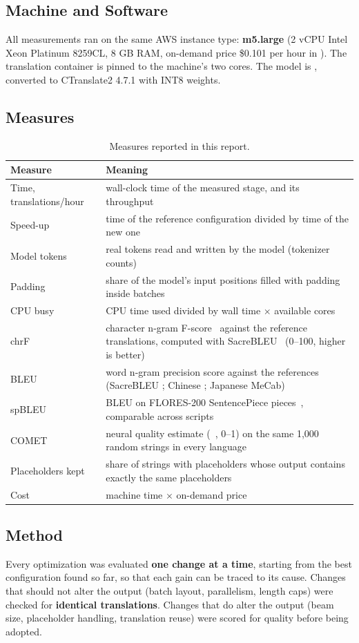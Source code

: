 \subsection{Machine and Software}
All measurements ran on the same AWS instance type: \textbf{m5.large} (2 vCPU Intel Xeon Platinum 8259CL, 8 GB RAM,
on-demand price \$0.101 per hour in ). The translation container is pinned to the machine's two cores.
The model is , converted to CTranslate2 4.7.1 with INT8 weights.

\subsection{Measures}
\begin{table}[H]
\centering
\caption[Measures]{Measures reported in this report.}
\label{tab:measures}
\begin{tabularx}{\linewidth}{@{}l L@{}}
\toprule
\textbf{Measure} & \textbf{Meaning} \\
\midrule
Time, translations/hour & wall-clock time of the measured stage, and its throughput \\
Speed-up & time of the reference configuration divided by time of the new one \\
Model tokens & real tokens read and written by the model (tokenizer counts) \\
Padding & share of the model's input positions filled with padding inside batches \\
CPU busy & CPU time used divided by wall time $\times$ available cores \\
chrF & character n-gram F-score~\cite{chrf} against the reference translations, computed with SacreBLEU~\cite{sacrebleu} (0--100, higher is better) \\
BLEU & word n-gram precision score against the references (SacreBLEU ; Chinese ; Japanese MeCab) \\
spBLEU & BLEU on FLORES-200 SentencePiece pieces~\cite{flores}, comparable across scripts \\
COMET & neural quality estimate (~\cite{comet}, 0--1) on the same 1,000 random strings in every language \\
Placeholders kept & share of strings with placeholders whose output contains exactly the same placeholders \\
Cost & machine time $\times$ on-demand price \\
\bottomrule
\end{tabularx}
\end{table}

\subsection{Method}
Every optimization was evaluated \textbf{one change at a time}, starting from the best configuration found so far, so that
each gain can be traced to its cause. Changes that should not alter the output (batch layout, parallelism, length caps)
were checked for \textbf{identical translations}. Changes that do alter the output (beam size, placeholder handling,
translation reuse) were scored for quality before being adopted.
